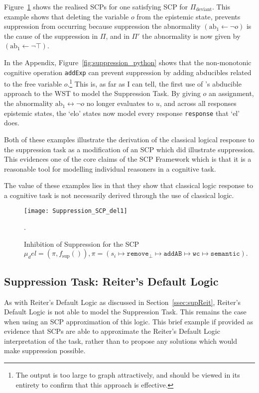 Figure~\ref{fig:Suppression_SCP_del1} shows the realised SCPs for one satisfying SCP for $\Pi_\text{deviant}$. This example shows that deleting the variable $o$ from the epistemic state, prevents suppression from occurring because suppression the abnormality $(\text{ab}_1 \leftarrow \lnot o )$ is the cause of the suppression in $\Pi$, and in $\Pi'$ the abnormality is now given by $(\text{ab}_1 \leftarrow \lnot \top )$.

In the Appendix, Figure~\ref{fig:suppression_python} shows that the non-monotonic cognitive operation \texttt{addExp} can prevent suppression by adding abducibles related to the  free variable $o$.\footnote{The output is too large to graph attractively, and should be viewed in its entirety to confirm that this approach is effective.} This is, as far as I can tell, the first use of \cite{holldobler2015weak}'s abducible approach to the WST to model the Suppression Task. By giving $o$ an assignment, the abnormality $\text{ab}_1\leftrightarrow \lnot o$ no longer evaluates to $u$, and across all responses epistemic states, the `elo' states now model every response \texttt{response} that `el' does.

Both of these examples illustrate the derivation of the classical logical response to the suppression task as a modification of an SCP which did illustrate suppression. This evidences one of the core claims of the SCP Framework which is that it is a reasonable tool for modelling individual reasoners in a cognitive task. 

The value of these examples lies in that they show that classical logic response to a cognitive task is not necessarily derived through the use of classical logic.

\begin{figure}
\centering \texttt{[image: Suppression\_SCP\_del1]}
\caption{Inhibition of Suppression for the SCP $\mu_del=(\pi,f_\text{sup}()), \pi = (s_i \longmapsto \texttt{remove}_\bot \longmapsto \texttt{addAB} \longmapsto \texttt{wc} \longmapsto \texttt{semantic}).$}.
\label{fig:Suppression_SCP_del1}
\end{figure}




\subsection{Suppression Task: Reiter's Default Logic}

As with  Reiter's Default Logic as discussed in Section~\ref{ssec:supReit}, Reiter's Default Logic is not able to model the Suppression Task. This remains the case when using an SCP approximation of this logic. This brief example if provided as evidence that SCPs are able to approximate the Reiter's Default Logic interpretation of the task, rather than to propose any solutions which would make suppression possible.

